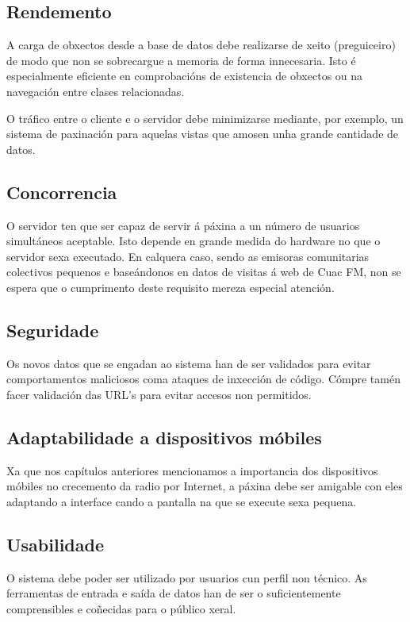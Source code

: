 \subsection{Rendemento}

A carga de obxectos desde a base de datos debe realizarse de xeito  (preguiceiro) de modo que non se sobrecargue a memoria de forma innecesaria. Isto é especialmente eficiente en comprobacións de existencia de obxectos ou na navegación entre clases relacionadas. 

O tráfico entre o cliente e o servidor debe minimizarse mediante, por exemplo, un sistema de paxinación para aquelas vistas que amosen unha grande cantidade de datos.

\subsection{Concorrencia}

O servidor ten que ser capaz de servir á páxina a un número de usuarios simultáneos aceptable. Isto depende en grande medida do hardware no que o servidor sexa executado. En calquera caso, sendo as emisoras comunitarias colectivos pequenos e baseándonos en datos de visitas á web de Cuac FM, non se espera que o cumprimento deste requisito mereza especial atención.

\subsection{Seguridade}

Os novos datos que se engadan ao sistema han de ser validados para evitar comportamentos maliciosos coma ataques de inxección de código. Cómpre tamén facer validación das URL's para evitar accesos non permitidos. 

\subsection{Adaptabilidade a dispositivos móbiles}

Xa que nos capítulos anteriores mencionamos a importancia dos dispositivos móbiles no crecemento da radio por Internet, a páxina debe ser amigable con eles adaptando a interface cando a pantalla na que se execute sexa pequena.


\subsection{Usabilidade}

O sistema debe poder ser utilizado por usuarios cun perfil non técnico. As ferramentas de entrada e saída de datos han de ser o suficientemente comprensibles e coñecidas para o público xeral.
